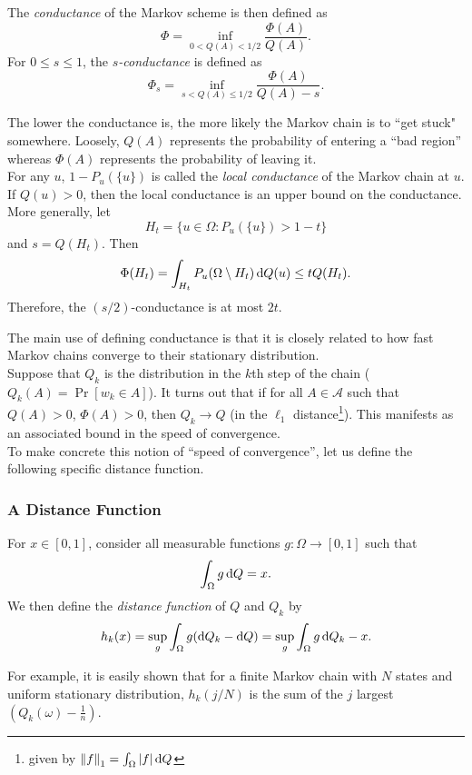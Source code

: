 \begin{fdef}
	\label{def: conductance}
	The \textit{conductance} of the Markov scheme is then defined as
	\[ \Phi = \inf_{0<Q(A)<1/2} \frac{\Phi(A)}{Q(A)}. \]
	For $0\leq s\leq 1$, the \textit{$s$-conductance} is defined as
	\[ \Phi_s = \inf_{s < Q(A) \leq 1/2} \frac{\Phi(A)}{Q(A)-s}. \]
\end{fdef}

The lower the conductance is, the more likely the Markov chain is to ``get stuck" somewhere. Loosely, $Q(A)$ represents the probability of entering a ``bad region'' whereas $\Phi(A)$ represents the probability of leaving it. \\

For any $u$, $1-P_u(\{u\})$ is called the \textit{local conductance} of the Markov chain at $u$. If $Q(u)>0$, then the local conductance is an upper bound on the conductance.\\
More generally, let
\[ H_t = \{u\in\Omega:P_u(\{u\}) > 1-t\} \]
and $s=Q(H_t)$. Then
\[ \Phi(H_t) = \int_{H_t} P_u(\Omega\setminus H_t)\operatorname{d}\!{Q}(u) \leq t Q(H_t). \]
Therefore, the $(s/2)$-conductance is at most $2t$.

The main use of defining conductance is that it is closely related to how fast Markov chains converge to their stationary distribution.\\
Suppose that $Q_k$ is the distribution in the $k$th step of the chain ($Q_k(A)=\Pr[w_k\in A]$). It turns out that if for all $A\in\mathcal{A}$ such that $Q(A)>0$, $\Phi(A)>0$, then $Q_k\to Q$ (in the $\ell_1$ distance\footnote{given by $\left\lVert f\right\rVert_1 = \int_\Omega |f|\operatorname{d}\!{Q}$}). This manifests as an associated bound in the speed of convergence.\\
To make concrete this notion of ``speed of convergence'', let us define the following specific distance function.

\subsubsection{A Distance Function}

\begin{fdef}
For $x\in[0,1]$, consider all measurable functions $g:\Omega\to[0,1]$ such that
\[ \int_{\Omega} g\operatorname{d}\!{Q} = x. \]
We then define the \textit{distance function} of $Q$ and $Q_k$ by
\[ h_k(x) = \sup_g \int_\Omega g(\operatorname{d}\!{Q}_k-\operatorname{d}\!{Q}) = \sup_g \int_\Omega g\operatorname{d}\!{Q}_k - x. \]
\end{fdef}

For example, it is easily shown that for a finite Markov chain with $N$ states and uniform stationary distribution, $h_k(j/N)$ is the sum of the $j$ largest $\left(Q_k(\omega)-\frac{1}{n}\right)$.\\


